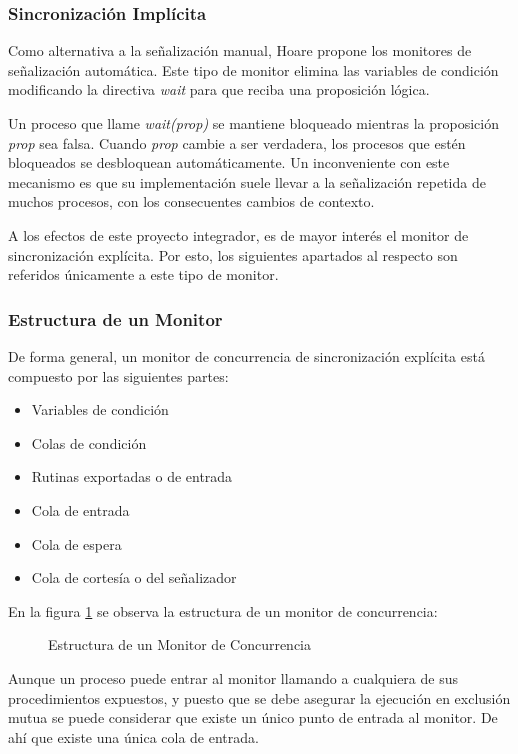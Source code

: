 \subsubsection{Sincronización Implícita}

Como alternativa a la señalización manual, Hoare propone los monitores de
señalización automática. Este tipo de monitor elimina las variables de
condición modificando la directiva \textit{wait} para que reciba una proposición
lógica.

Un proceso que llame \textit{wait(prop)} se mantiene bloqueado mientras la
proposición \textit{prop} sea falsa. Cuando \textit{prop} cambie a ser
verdadera, los procesos que estén bloqueados se desbloquean automáticamente.
Un inconveniente con este mecanismo es que su implementación suele llevar a la
señalización repetida de muchos procesos, con los consecuentes cambios de contexto.

A los efectos de este proyecto integrador, es de mayor interés el monitor de
sincronización explícita. Por esto, los siguientes apartados al respecto son
referidos únicamente a este tipo de monitor.

\subsubsection{Estructura de un Monitor}
De forma general, un monitor de concurrencia de sincronización explícita está
compuesto por las siguientes partes:
\begin{itemize}
    \item Variables de condición
    \item Colas de condición
    \item Rutinas exportadas o de entrada
    \item Cola de entrada
    \item Cola de espera
    \item Cola de cortesía o del señalizador
\end{itemize}

En la figura \ref{fig:monitor01} se observa la estructura de un monitor de
concurrencia:

\begin{figure}[H]
  \centering
  \caption{Estructura de un Monitor de Concurrencia}
  \label{fig:monitor01}
\end{figure}

Aunque un proceso puede entrar al monitor llamando a cualquiera de sus
procedimientos expuestos, y puesto que se debe asegurar la ejecución en
exclusión mutua se puede considerar que existe un único punto de entrada al
monitor. De ahí que existe una única cola de entrada.

